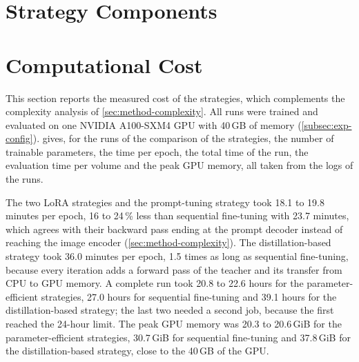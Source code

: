 
\section{Strategy Components}
\label{sec:exp-components}

\section{Computational Cost}
\label{sec:exp-compute}
This section reports the measured cost of the strategies, which complements the complexity analysis of \cref{sec:method-complexity}.
All runs were trained and evaluated on one NVIDIA A100-SXM4 GPU with 40\,GB of memory (\cref{subsec:exp-config}).
 gives, for the runs of the comparison of the strategies, the number of trainable parameters, the time per epoch, the total time of the run, the evaluation time per volume and the peak GPU memory, all taken from the logs of the runs.

\begin{table}[tb]
\centering
\caption[Measured cost of the strategies]{Measured cost of the strategies in the comparison (full training split, original task order, one NVIDIA A100 40\,GB). Trainable param.: parameters set as trainable, in millions; of the 440.03 million of sequential fine-tuning and the distillation-based strategy, 339.29 million receive gradients (\cref{subsec:method-seqft}). Epoch: mean wall-clock time of one training epoch including validation. Wall-clock: total time of all jobs of the run, including the evaluation of the protocol and restarts after the 24-hour limit. Evaluation: median time per test volume, including data loading and text encoding. Peak GPU mem.: maximum over all jobs of the run.}
\label{tab:ch6_compute}

\end{table}

The two LoRA strategies and the prompt-tuning strategy took 18.1 to 19.8 minutes per epoch, 16 to 24\,\% less than sequential fine-tuning with 23.7 minutes, which agrees with their backward pass ending at the prompt decoder instead of reaching the image encoder (\cref{sec:method-complexity}).
The distillation-based strategy took 36.0 minutes per epoch, 1.5 times as long as sequential fine-tuning, because every iteration adds a forward pass of the teacher and its transfer from CPU to GPU memory.
A complete run took 20.8 to 22.6 hours for the parameter-efficient strategies, 27.0 hours for sequential fine-tuning and 39.1 hours for the distillation-based strategy; the last two needed a second job, because the first reached the 24-hour limit.
The peak GPU memory was 20.3 to 20.6\,GiB for the parameter-efficient strategies, 30.7\,GiB for sequential fine-tuning and 37.8\,GiB for the distillation-based strategy, close to the 40\,GB of the GPU.

